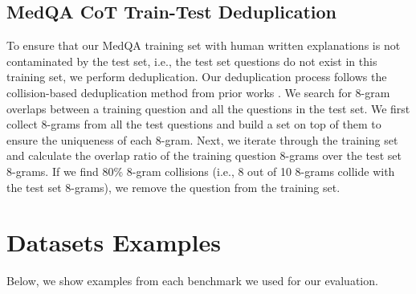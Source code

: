 \documentclass{article}
\begin{document}
\subsection{MedQA CoT Train-Test Deduplication}
To ensure that our MedQA training set with human written explanations is not contaminated by the test set, i.e., the test set questions do not exist in this training set, we perform deduplication. Our deduplication process follows the collision-based deduplication method from prior works \citep{gpt-3, llama2}. We search for 8-gram overlaps between a training question and all the questions in the test set. We first collect 8-grams from all the test questions and build a set on top of them to ensure the uniqueness of each 8-gram. Next, we iterate through the training set and calculate the overlap ratio of the training question 8-grams over the test set 8-grams. If we find 80\% 8-gram collisions (i.e., 8 out of 10 8-grams collide with the test set 8-grams), we remove the question from the training set. 

\section{Datasets Examples}
Below, we show examples from each benchmark we used for our evaluation. 
\end{document}
